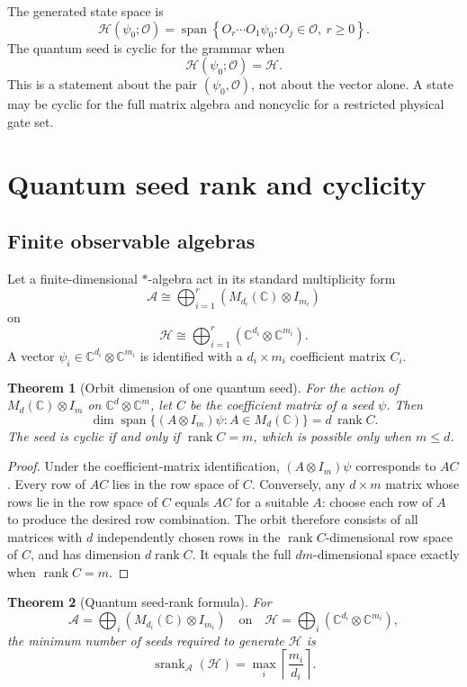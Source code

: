 \documentclass[11pt]{article}
\newtheorem{theorem}{Theorem}[section]
\theoremstyle{definition}
\theoremstyle{remark}
\newcommand{\cA}{\mathcal A}
\newcommand{\cH}{\mathcal H}
\newcommand{\cO}{\mathcal O}
\newcommand{\bbC}{\mathbb C}
\newcommand{\rank}{\operatorname{rank}}
\begin{document}
The generated state space is
\[
\cH(\psi_0;\cO)
=
\operatorname{span}
\left\{
O_r\cdots O_1\psi_0:
O_j\in\cO,
\ r\ge0
\right\}.
\]
The quantum seed is cyclic for the grammar when
\[
\cH(\psi_0;\cO)=\cH.
\]
This is a statement about the pair $(\psi_0,\cO)$, not about the vector alone. A state may be cyclic for the full matrix algebra and noncyclic for a restricted physical gate set.

\section{Quantum seed rank and cyclicity}

\subsection{Finite observable algebras}

Let a finite-dimensional $*$-algebra act in its standard multiplicity form
\[
\cA
\cong
\bigoplus_{i=1}^r
\left(M_{d_i}(\bbC)\otimes I_{m_i}\right)
\]
on
\[
\cH
\cong
\bigoplus_{i=1}^r
\left(\bbC^{d_i}\otimes\bbC^{m_i}\right).
\]
A vector $\psi_i\in\bbC^{d_i}\otimes\bbC^{m_i}$ is identified with a $d_i\times m_i$ coefficient matrix $C_i$.

\begin{theorem}[Orbit dimension of one quantum seed]
For the action of $M_d(\bbC)\otimes I_m$ on $\bbC^d\otimes\bbC^m$, let $C$ be the coefficient matrix of a seed $\psi$. Then
\[
\boxed{
\dim\operatorname{span}\{(A\otimes I_m)\psi:A\in M_d(\bbC)\}
=d\,\rank C.
}
\]
The seed is cyclic if and only if $\rank C=m$, which is possible only when $m\le d$.
\end{theorem}

\begin{proof}
Under the coefficient-matrix identification, $(A\otimes I_m)\psi$ corresponds to $AC$. Every row of $AC$ lies in the row space of $C$. Conversely, any $d\times m$ matrix whose rows lie in the row space of $C$ equals $AC$ for a suitable $A$: choose each row of $A$ to produce the desired row combination. The orbit therefore consists of all matrices with $d$ independently chosen rows in the $\rank C$-dimensional row space of $C$, and has dimension $d\rank C$. It equals the full $dm$-dimensional space exactly when $\rank C=m$.
\end{proof}

\begin{theorem}[Quantum seed-rank formula]
For
\[
\cA=\bigoplus_i(M_{d_i}(\bbC)\otimes I_{m_i})
\quad\text{on}\quad
\cH=\bigoplus_i(\bbC^{d_i}\otimes\bbC^{m_i}),
\]
the minimum number of seeds required to generate $\cH$ is
\[
\boxed{
\operatorname{srank}_{\cA}(\cH)
=
\max_i\left\lceil\frac{m_i}{d_i}\right\rceil.
}
\]
\end{theorem}
\end{document}
